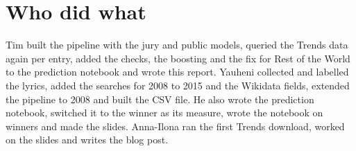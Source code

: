 \section{Who did what}

Tim built the pipeline with the jury and public models, queried the Trends data again per entry, added the checks, the boosting and the fix for Rest of the World to the prediction notebook and wrote this report. Yauheni collected and labelled the lyrics, added the searches for 2008 to 2015 and the Wikidata fields, extended the pipeline to 2008 and built the CSV file. He also wrote the prediction notebook, switched it to the winner as its measure, wrote the notebook on winners and made the slides. Anna-Ilona ran the first Trends download, worked on the slides and writes the blog post.
